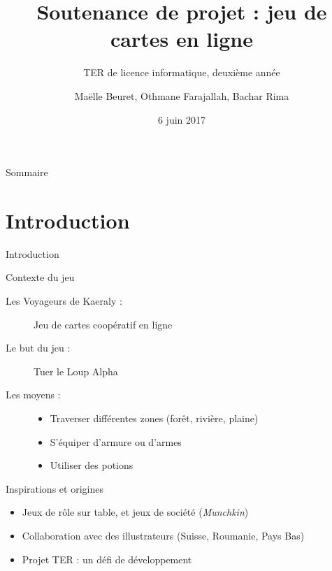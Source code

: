 \documentclass{bredelebeamer}
\title[Jeu de cartes en lignes]{Soutenance de projet : jeu de cartes en ligne}
\subtitle{TER de licence informatique, deuxième année}
\author{Maëlle Beuret, Othmane Farajallah, Bachar Rima}
\institute[UM]
\date{6 juin 2017}
\begin{document}
  \begin{frame}
    \titlepage
  \end{frame}

  \begin{frame}{Sommaire}
    \tableofcontents
  \end{frame}

  \section{Introduction}
  \begin{frame}{Introduction}
    \begin{block}{Contexte du jeu}
      \begin{description}
        \item [Les Voyageurs de Kaeraly :]{Jeu de cartes coopératif en ligne}
        \pause
        \item [Le but du jeu :]{Tuer le Loup Alpha}
        \pause
        \item [Les moyens : ]{
          \begin{itemize}
            \item {Traverser différentes zones (forêt, rivière, plaine)}
            \pause
            \item {S'équiper d'armure ou d'armes}
            \pause
            \item {Utiliser des potions}
            \pause
          \end{itemize}
        }
      \end{description}
    \end{block}

    \begin{block}{Inspirations et origines}
      \begin{itemize}
        \item {Jeux de rôle sur table, et jeux de société (\textit{Munchkin})}
        \pause
        \item {Collaboration avec des illustrateurs (Suisse, Roumanie, Pays Bas)}
        \pause
        \item {Projet TER : un défi de développement}
      \end{itemize}
    \end{block}
  \end{frame}

\end{document}
